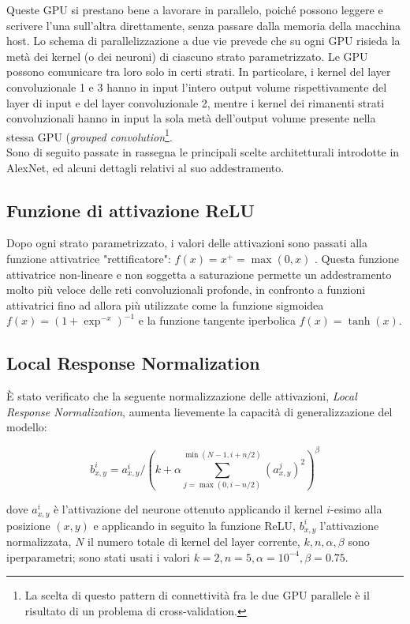 Queste GPU si prestano bene a lavorare in parallelo, poiché possono leggere e scrivere l'una sull'altra direttamente, senza passare dalla memoria della macchina host. Lo schema di parallelizzazione a due vie prevede che su ogni GPU risieda la metà dei kernel (o dei neuroni) di ciascuno strato parametrizzato. Le GPU possono comunicare tra loro solo in certi strati. In particolare, i kernel del layer convoluzionale 1 e 3 hanno in input l'intero output volume rispettivamente del layer di input e del layer convoluzionale 2, mentre i kernel dei rimanenti strati convoluzionali hanno in input la sola metà dell'output volume presente nella stessa GPU (\textit{grouped convolution}\footnote{La scelta di questo pattern di connettività fra le due GPU parallele è il risultato di un problema di cross-validation.}.\\

Sono di seguito passate in rassegna le principali scelte architetturali introdotte in AlexNet, ed alcuni dettagli relativi al suo addestramento.

\subsection*{Funzione di attivazione ReLU}
Dopo ogni strato parametrizzato, i valori delle attivazioni sono passati alla funzione attivatrice "rettificatore": $f(x)=x^{+}=\max(0,x)$ \cite{nairhinton}. Questa funzione attivatrice non-lineare e non soggetta a saturazione permette un addestramento molto più veloce delle reti convoluzionali profonde, in confronto a funzioni attivatrici fino ad allora più utilizzate come la funzione sigmoidea $f(x)=(1+\exp^{-x})^{-1}$ e la funzione tangente iperbolica $f(x)=\tanh(x)$.

\subsection*{Local Response Normalization}
È stato verificato che la seguente normalizzazione delle attivazioni, \textit{Local Response Normalization}, aumenta lievemente la capacità di generalizzazione del modello:

\[b_{x,y}^{i}=a_{x,y}^{i}/\left(k+\alpha \sum_{j=\max(0,i-n/2)}^{\min(N-1,i+n/2)}(a_{x,y}^{j})^{2}\right)^{\beta}\]

dove $a_{x,y}^{i}$ è l'attivazione del neurone ottenuto applicando il kernel $i$-esimo alla posizione $(x,y)$ e applicando in seguito la funzione ReLU, $b_{x,y}^{i}$ l'attivazione normalizzata, $N$ il numero totale di kernel del layer corrente, $k, n, \alpha, \beta$ sono iperparametri; sono stati usati i valori $k=2, n=5, \alpha=10^{-4}, \beta=0.75$.

